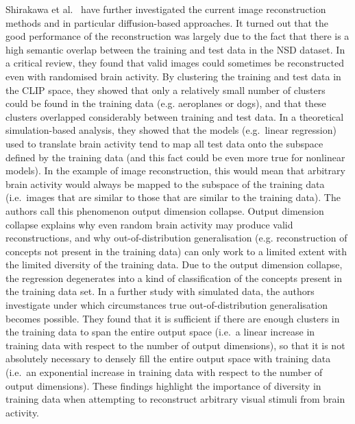 Shirakawa et al.~\cite{shirakawaSpuriousReconstructionBrain2024} have further investigated the current image reconstruction methods and in particular diffusion-based approaches. It turned out that the good performance of the reconstruction was largely due to the fact that there is a high semantic overlap between the training and test data in the NSD dataset. In a critical review, they found that valid images could sometimes be reconstructed even with randomised brain activity. By clustering the training and test data in the CLIP space, they showed that only a relatively small number of clusters could be found in the training data (e.g. aeroplanes or dogs), and that these clusters overlapped considerably between training and test data. In a theoretical simulation-based analysis, they showed that the models (e.g.\ linear regression) used to translate brain activity tend to map all test data onto the subspace defined by the training data (and this fact could be even more true for nonlinear models). In the example of image reconstruction, this would mean that arbitrary brain activity would always be mapped to the subspace of the training data (i.e.\ images that are similar to those that are similar to the training data). The authors call this phenomenon output dimension collapse. Output dimension collapse explains why even random brain activity may produce valid reconstructions, and why out-of-distribution generalisation (e.g. reconstruction of concepts not present in the training data) can only work to a limited extent with the limited diversity of the training data. Due to the  output dimension collapse, the regression degenerates into a kind of classification of the concepts present in the training data set. In a further study with simulated data, the authors investigate under which circumstances true out-of-distribution generalisation becomes possible. They found that it is sufficient if there are enough clusters in the training data to span the entire output space (i.e.\ a linear increase in training data with respect to the number of output dimensions), so that it is not absolutely necessary to densely fill the entire output space with training data (i.e.\ an exponential increase in training data with respect to the number of output dimensions). These findings highlight the importance of diversity in training data when attempting to reconstruct arbitrary visual stimuli from brain activity.

